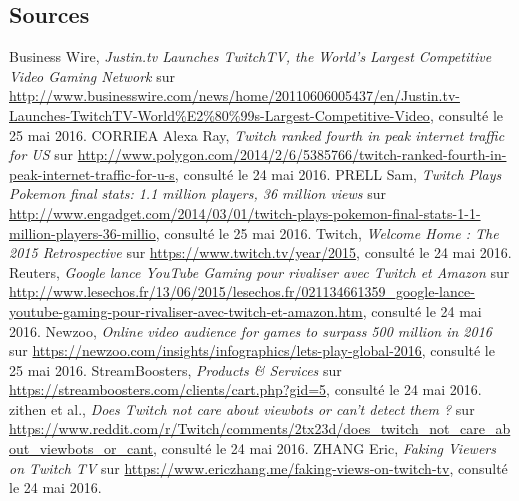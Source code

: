 \documentclass[a4paper]{article}
\begin{document}
\subsection{Sources}
\begin{thebibliography}{10}	
      Business Wire, \textit{Justin.tv Launches TwitchTV, the World’s Largest Competitive Video Gaming Network} sur \url{http://www.businesswire.com/news/home/20110606005437/en/Justin.tv-Launches-TwitchTV-World\%E2\%80\%99s-Largest-Competitive-Video}, consulté le 25 mai 2016.
      CORRIEA Alexa Ray, \textit{Twitch ranked fourth in peak internet traffic for US} sur \url{http://www.polygon.com/2014/2/6/5385766/twitch-ranked-fourth-in-peak-internet-traffic-for-u-s}, consulté le 24 mai 2016.
      PRELL Sam, \textit{Twitch Plays Pokemon final stats: 1.1 million players, 36 million views} sur \url{http://www.engadget.com/2014/03/01/twitch-plays-pokemon-final-stats-1-1-million-players-36-millio}, consulté le 25 mai 2016.
     Twitch, \textit{Welcome Home : The 2015 Retrospective} sur \url{https://www.twitch.tv/year/2015}, consulté le 24 mai 2016.
     Reuters, \textit{Google lance YouTube Gaming pour rivaliser avec Twitch et Amazon} sur \url{http://www.lesechos.fr/13/06/2015/lesechos.fr/021134661359_google-lance-youtube-gaming-pour-rivaliser-avec-twitch-et-amazon.htm}, consulté le 24 mai 2016.
     Newzoo, \textit{Online video audience for games to surpass 500 million in 2016} sur \url{https://newzoo.com/insights/infographics/lets-play-global-2016}, consulté le 25 mai 2016.     
     StreamBoosters, \textit{Products \& Services} sur \url{https://streamboosters.com/clients/cart.php?gid=5}, consulté le 24 mai 2016.
     zithen et al., \textit{Does Twitch not care about viewbots or can't detect them ?} sur \url{https://www.reddit.com/r/Twitch/comments/2tx23d/does_twitch_not_care_about_viewbots_or_cant}, consulté le 24 mai 2016.
     ZHANG Eric, \textit{Faking Viewers on Twitch TV} sur \url{https://www.ericzhang.me/faking-views-on-twitch-tv}, consulté le 24 mai 2016.
\end{thebibliography}
\end{document}
